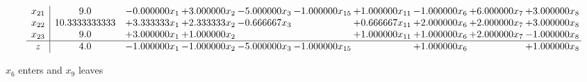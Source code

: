 \documentclass[10pt]{article}
\begin{document}
\[\begin{array}{c| c c@{\hskip 2pt} c@{\hskip 2pt} c@{\hskip 2pt} c@{\hskip 2pt} c@{\hskip 2pt} c@{\hskip 2pt} c@{\hskip 2pt} c@{\hskip 2pt} }
 x_{21}   &  9.0 & -0.000000 x_{1} & + 3.000000 x_{2} & -5.000000 x_{3} & -1.000000 x_{15} & + 1.000000 x_{11} & -1.000000 x_{6} & + 6.000000 x_{7} & + 3.000000 x_{8}\\
 x_{22}   &  10.3333333333 & + 3.333333 x_{1} & + 2.333333 x_{2} & -0.666667 x_{3} &   & + 0.666667 x_{11} & + 2.000000 x_{6} & + 2.000000 x_{7} & + 3.000000 x_{8}\\
 x_{23}   &  9.0 & + 3.000000 x_{1} & + 1.000000 x_{2} &    &   & + 1.000000 x_{11} & + 1.000000 x_{6} & + 2.000000 x_{7} & -1.000000 x_{8}\\
\hline
z    &  4.0 & -1.000000 x_{1} & -1.000000 x_{2} & -5.000000 x_{3} & -1.000000 x_{15} &   & + 1.000000 x_{6} &   & + 1.000000 x_{8}\\
\end{array}\]


 $ x_{6} $ enters and $ x_{9} $ leaves 
\end{document}

